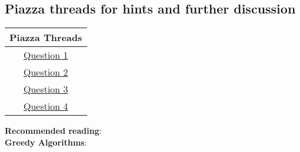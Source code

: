 \documentclass[12pt]{article}
\begin{document}
\hrulefill
\pagebreak

\subsection*{Piazza threads for hints and further discussion}
\begin{center}
    \begin{tabular}{|c|}
    \hline
    Piazza Threads \\ [0.5ex] 
    \hline \hline 
     \href{https://piazza.com/class/ka2roz7rb9m3j4?cid=42}{Question 1}\\
     \href{https://piazza.com/class/ka2roz7rb9m3j4?cid=43}{Question 2}\\
     \href{https://piazza.com/class/ka2roz7rb9m3j4?cid=44}{Question 3}\\
     \href{https://piazza.com/class/ka2roz7rb9m3j4?cid=45}{Question 4}\\

    \hline
    \end{tabular}
\end{center}

\textbf{Recommended reading}: \\
\textbf{Greedy Algorithms}: 
\pagebreak
\end{document}
